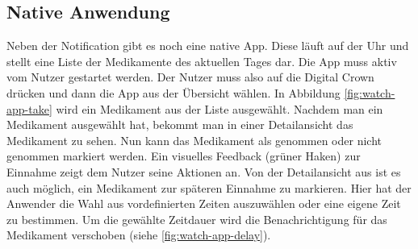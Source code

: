 \subsection{Native Anwendung}
Neben der Notification gibt es noch eine native App. Diese läuft auf der Uhr und stellt eine Liste der Medikamente des aktuellen Tages dar. Die App muss aktiv vom Nutzer gestartet werden. Der Nutzer muss also auf die Digital Crown drücken und dann die App aus der Übersicht wählen. In Abbildung \ref{fig:watch-app-take} wird ein Medikament aus der Liste ausgewählt. Nachdem man ein Medikament ausgewählt hat, bekommt man in einer Detailansicht das Medikament zu sehen. Nun kann das Medikament als genommen oder nicht genommen markiert werden. Ein visuelles Feedback (grüner Haken) zur Einnahme zeigt dem Nutzer seine Aktionen an. Von der Detailansicht aus ist es auch möglich, ein Medikament zur späteren Einnahme zu markieren. Hier hat der Anwender die Wahl aus vordefinierten Zeiten auszuwählen oder eine eigene Zeit zu bestimmen. Um die gewählte Zeitdauer wird die Benachrichtigung für das Medikament verschoben (siehe \ref{fig:watch-app-delay}). 

